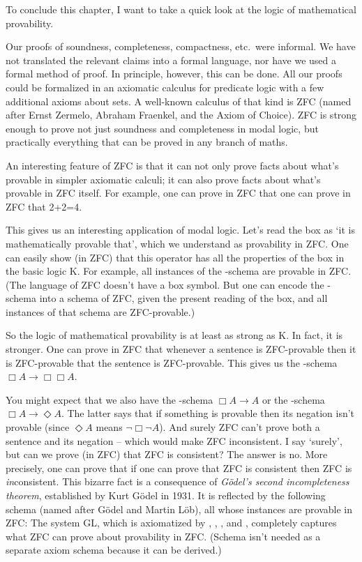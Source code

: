 To conclude this chapter, I want to take a quick look at the logic of
mathematical provability.

Our proofs of soundness, completeness, compactness, etc.\ were informal. We have
not translated the relevant claims into a formal language, nor have we used a
formal method of proof. In principle, however, this can be done. All our
proofs could be formalized in an axiomatic calculus for predicate logic with a
few additional axioms about sets. A well-known calculus of that kind is ZFC
(named after Ernst Zermelo, Abraham Fraenkel, and the Axiom of Choice). ZFC is
strong enough to prove not just soundness and completeness in modal logic, but
practically everything that can be proved in any branch of maths.

An interesting feature of ZFC is that it can not only prove facts about what's
provable in simpler axiomatic calculi; it can also prove facts about what's
provable in ZFC itself. For example, one can prove in ZFC that one can prove in
ZFC that 2+2=4.

This gives us  an interesting application of modal logic. Let's read the box as
`it is mathematically provable that', which we understand as provability in ZFC.
One can easily show (in ZFC) that this operator has all the properties of the
box in the basic logic K. For example, all instances of the -schema are
provable in ZFC. (The language of ZFC doesn't have a box symbol. But one can
encode the -schema into a schema of ZFC, given the present reading of the
box, and all instances of that schema are ZFC-provable.)

So the logic of mathematical provability is at least as strong as K. In fact, it
is stronger. One can prove in ZFC that whenever a sentence is ZFC-provable then
it is ZFC-provable that the sentence is ZFC-provable. This gives us the
-schema $\Box A \to \Box\Box A$.

You might expect that we also have the -schema $\Box A \to A$ or the
-schema $\Box A \to \Diamond A$. The latter says that if something is
provable then its negation isn't provable (since $\Diamond A$ means
$\neg\Box\neg A$). And surely ZFC can't prove both a sentence and its negation
-- which would make ZFC inconsistent. I say `surely', but can we
prove (in ZFC) that ZFC is consistent? The answer is no. More precisely, one can
prove that if one can prove that ZFC is consistent then ZFC is
\emph{in}consistent. This bizarre fact is a consequence of \emph{G\"odel's
  second incompleteness theorem}, established by Kurt G\"odel in 1931. It is
reflected by the following schema (named after G\"odel and Martin L\"ob), all
whose instances are provable in ZFC:
%
%
The system GL, which is axiomatized by , , , and ,
completely captures what ZFC can prove about provability in ZFC. (Schema 
isn't needed as a separate axiom schema because it can be derived.)%

